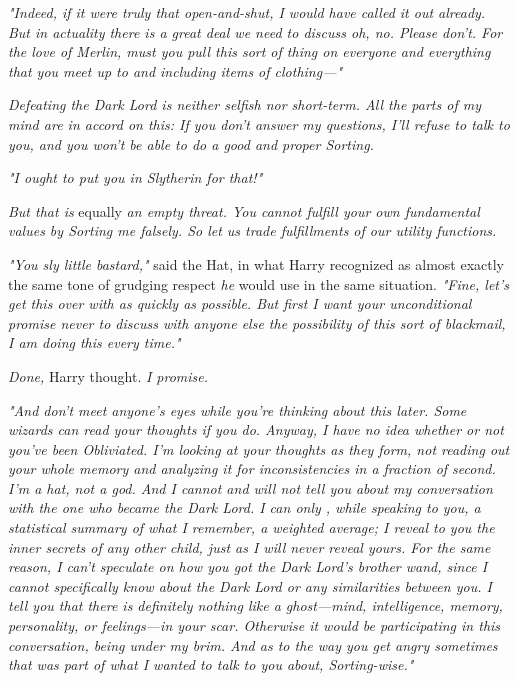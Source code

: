 \emph{"Indeed, if it were truly that open-and-shut, I would have called it out
already. But in actuality there is a great deal we need to discuss{\el} oh,
    no. Please don't. For the love of Merlin, must you pull this sort of
    thing on everyone and everything that you meet up to and including items of
    clothing\mbox{---}"}

\emph{Defeating the Dark Lord is neither selfish nor short-term. All the parts
of my mind are in accord on this: If you don't answer my questions, I'll refuse
to talk to you, and you won't be able to do a good and proper Sorting.}

\emph{"I ought to put you in Slytherin for that!"}

\emph{But that is} equally \emph{an empty threat. You cannot fulfill your own
fundamental values by Sorting me falsely. So let us trade fulfillments of our
utility functions.}

\emph{"You sly little bastard,"} said the Hat, in what Harry recognized as
almost exactly the same tone of grudging respect \emph{he} would use in the
same situation. \emph{"Fine, let's get this over with as quickly as possible.
But first I want your unconditional promise never to discuss with anyone else
the possibility of this sort of blackmail, I am  doing this every time."}

\emph{Done,} Harry thought. \emph{I promise.}

\emph{"And don't meet anyone's eyes while you're thinking about this later.
Some wizards can read your thoughts if you do. Anyway, I have no idea whether
or not you've been Obliviated. I'm looking at your thoughts as they form, not
reading out your whole memory and analyzing it for inconsistencies in a
fraction of second. I'm a hat, not a god. And I cannot and will not tell you
about my conversation with the one who became the Dark Lord. I can only
, while speaking to you, a statistical summary of what I remember, a
weighted average; I  reveal to you the inner secrets of any other
child, just as I will never reveal yours. For the same reason, I can't
speculate on how you got the Dark Lord's brother wand, since I cannot
specifically know about the Dark Lord or any similarities between you. I
 tell you that there is definitely nothing like a ghost---mind,
    intelligence, memory, personality, or feelings---in your scar. Otherwise it
    would be participating in this conversation, being under my brim. And as to the
    way you get angry sometimes{\el} that was part of what I wanted to talk to
    you about, Sorting-wise."}

